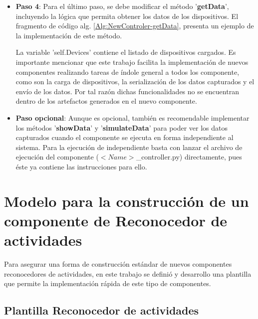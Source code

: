 \begin{itemize}
            \item \textbf{Paso 4}: Para el último paso, se debe modificar el método '\textbf{getData}', incluyendo la lógica que permita obtener los datos de los dispositivos. El fragmento de código alg. \ref{Alg:NewControler-getData}, presenta un ejemplo de la implementación de este método.

            
            
            La variable 'self.Devices' contiene el listado de dispositivos cargados. Es importante mencionar que este trabajo facilita la implementación de nuevos componentes realizando tareas de índole general a todos los componente, como son la carga de dispositivos, la serialización de los datos capturados y el envío de los datos. Por tal razón dichas funcionalidades no se encuentran dentro de los artefactos generados en el nuevo componente.
            
            \item \textbf{Paso opcional}: Aunque es opcional, también es recomendable implementar los métodos '\textbf{showData}' y '\textbf{simulateData}' para poder ver los datos capturados cuando el componente se ejecuta en forma independiente al sistema. Para la ejecución de independiente basta con lanzar el archivo de ejecución del componente ($<Name>$\_controller.py) directamente, pues éste ya contiene las instrucciones para ello.
            
        \end{itemize}
        
    \newpage

\section{Modelo para la construcción de un componente de Reconocedor de actividades}
\label{Sec:ClassifierHARTemplate}
    Para asegurar una forma de construcción estándar de nuevos componentes reconocedores de actividades, en este trabajo se definió y desarrollo una plantilla que permite la implementación rápida de este tipo de componentes.

    \subsection{Plantilla Reconocedor de actividades}
    \label{sub:TplHAR}
        
